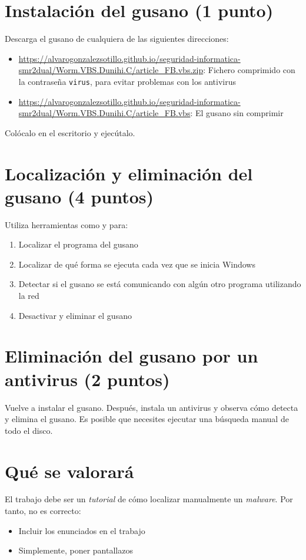 \section{Instalación del gusano (1 punto)}
Descarga el gusano de cualquiera de las siguientes direcciones:
\begin{itemize}
\item \url{https://alvarogonzalezsotillo.github.io/seguridad-informatica-smr2dual/Worm.VBS.Dunihi.C/article_FB.vbs.zip}: Fichero comprimido con la contraseña \texttt{virus}, para evitar problemas con los antivirus
\item \url{https://alvarogonzalezsotillo.github.io/seguridad-informatica-smr2dual/Worm.VBS.Dunihi.C/article_FB.vbs}: El gusano sin comprimir
\end{itemize}

Colócalo en el escritorio y ejecútalo.

\section{Localización y eliminación del gusano (4 puntos)}
Utiliza herramientas como  y  para:
\begin{enumerate}
\item Localizar el programa del gusano
\item Localizar de qué forma se ejecuta cada vez que se inicia Windows
\item Detectar si el gusano se está comunicando con algún otro programa utilizando la red
\item Desactivar y eliminar el gusano
\end{enumerate}

\section{Eliminación del gusano por un antivirus (2 puntos)}
Vuelve a instalar el gusano. Después, instala un antivirus y observa cómo detecta y elimina el gusano. Es posible que necesites ejecutar una búsqueda manual de todo el disco.




\section{Qué se valorará}
El trabajo debe ser un \textit{tutorial} de cómo localizar manualmente un \textit{malware}. Por tanto, no es correcto:
\begin{itemize}
\item Incluir los enunciados en el trabajo
\item Simplemente, poner pantallazos
\end{itemize}


